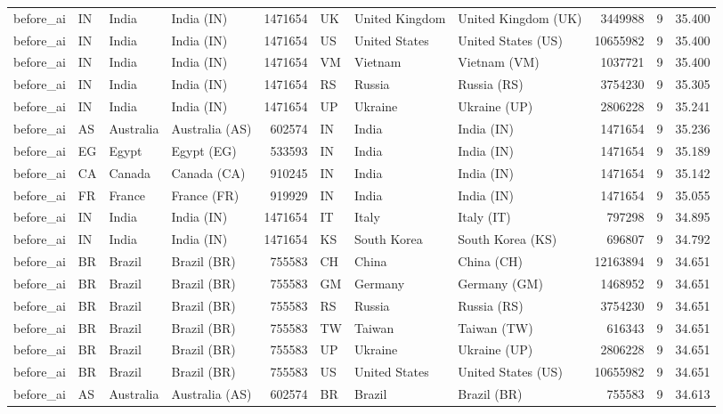 \begin{tabular}{llllrlllrrr}
before\_ai & IN & India & India (IN) & 1471654 & UK & United Kingdom & United Kingdom (UK) & 3449988 & 9 & 35.400 \\
before\_ai & IN & India & India (IN) & 1471654 & US & United States & United States (US) & 10655982 & 9 & 35.400 \\
before\_ai & IN & India & India (IN) & 1471654 & VM & Vietnam & Vietnam (VM) & 1037721 & 9 & 35.400 \\
before\_ai & IN & India & India (IN) & 1471654 & RS & Russia & Russia (RS) & 3754230 & 9 & 35.305 \\
before\_ai & IN & India & India (IN) & 1471654 & UP & Ukraine & Ukraine (UP) & 2806228 & 9 & 35.241 \\
before\_ai & AS & Australia & Australia (AS) & 602574 & IN & India & India (IN) & 1471654 & 9 & 35.236 \\
before\_ai & EG & Egypt & Egypt (EG) & 533593 & IN & India & India (IN) & 1471654 & 9 & 35.189 \\
before\_ai & CA & Canada & Canada (CA) & 910245 & IN & India & India (IN) & 1471654 & 9 & 35.142 \\
before\_ai & FR & France & France (FR) & 919929 & IN & India & India (IN) & 1471654 & 9 & 35.055 \\
before\_ai & IN & India & India (IN) & 1471654 & IT & Italy & Italy (IT) & 797298 & 9 & 34.895 \\
before\_ai & IN & India & India (IN) & 1471654 & KS & South Korea & South Korea (KS) & 696807 & 9 & 34.792 \\
before\_ai & BR & Brazil & Brazil (BR) & 755583 & CH & China & China (CH) & 12163894 & 9 & 34.651 \\
before\_ai & BR & Brazil & Brazil (BR) & 755583 & GM & Germany & Germany (GM) & 1468952 & 9 & 34.651 \\
before\_ai & BR & Brazil & Brazil (BR) & 755583 & RS & Russia & Russia (RS) & 3754230 & 9 & 34.651 \\
before\_ai & BR & Brazil & Brazil (BR) & 755583 & TW & Taiwan & Taiwan (TW) & 616343 & 9 & 34.651 \\
before\_ai & BR & Brazil & Brazil (BR) & 755583 & UP & Ukraine & Ukraine (UP) & 2806228 & 9 & 34.651 \\
before\_ai & BR & Brazil & Brazil (BR) & 755583 & US & United States & United States (US) & 10655982 & 9 & 34.651 \\
before\_ai & AS & Australia & Australia (AS) & 602574 & BR & Brazil & Brazil (BR) & 755583 & 9 & 34.613 \\

\end{tabular}
